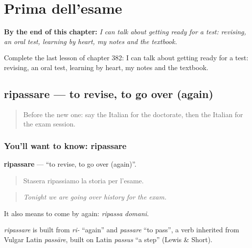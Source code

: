 
\chapter{Prima dell'esame}
\label{ch:it-prima-dell-esame}

\begin{chapteropening}
\textbf{By the end of this chapter:} \emph{I can talk about getting ready for a test: revising, an oral test, learning by heart, my notes and the textbook.}

Complete the last lesson of chapter 382: I can talk about getting ready for a test: revising, an oral test, learning by heart, my notes and the textbook.
\end{chapteropening}

\section[ripassare]{ripassare — to revise, to go over (again)}

\label{lesson:IT-C382-ripassare}



\begin{quote}
Before the new one: say the Italian for the doctorate, then the Italian for the exam session.
\end{quote}

\subsection*{You'll want to know: ripassare}
\textbf{ripassare} — \textquotedblleft{}to revise, to go over (again)\textquotedblright{}.

\begin{quote}
Stasera ripassiamo la storia per l'esame.
\end{quote}

\begin{quote}
\emph{Tonight we are going over history for the exam.}
\end{quote}

It also means to come by again: \emph{ripassa domani}.

\begin{cousinweb}
\emph{ripassare} is built from \emph{ri-} \textquotedblleft{}again\textquotedblright{} and \emph{passare} \textquotedblleft{}to pass\textquotedblright{}, a verb inherited from Vulgar Latin \emph{passāre}, built on Latin \emph{passus} \textquotedblleft{}a step\textquotedblright{} (Lewis \& Short).
\end{cousinweb}

